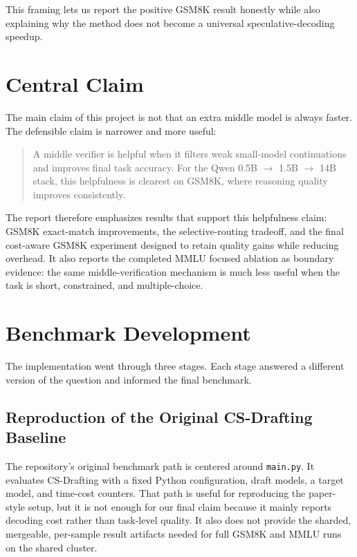 \documentclass[11pt]{article}
\begin{document}
This framing lets us report the positive GSM8K result honestly while also explaining why the method does not become a universal speculative-decoding speedup.

\section{Central Claim}

The main claim of this project is not that an extra middle model is always faster. The defensible claim is narrower and more useful:

\begin{quote}
A middle verifier is helpful when it filters weak small-model continuations and improves final task accuracy. For the Qwen 0.5B $\rightarrow$ 1.5B $\rightarrow$ 14B stack, this helpfulness is clearest on GSM8K, where reasoning quality improves consistently.
\end{quote}

The report therefore emphasizes results that support this helpfulness claim: GSM8K exact-match improvements, the selective-routing tradeoff, and the final cost-aware GSM8K experiment designed to retain quality gains while reducing overhead. It also reports the completed MMLU focused ablation as boundary evidence: the same middle-verification mechanism is much less useful when the task is short, constrained, and multiple-choice.

\section{Benchmark Development}

The implementation went through three stages. Each stage answered a different version of the question and informed the final benchmark.

\subsection{Reproduction of the Original CS-Drafting Baseline}

The repository's original benchmark path is centered around \texttt{main.py}. It evaluates CS-Drafting with a fixed Python configuration, draft models, a target model, and time-cost counters. That path is useful for reproducing the paper-style setup, but it is not enough for our final claim because it mainly reports decoding cost rather than task-level quality. It also does not provide the sharded, mergeable, per-sample result artifacts needed for full GSM8K and MMLU runs on the shared cluster.
\end{document}
